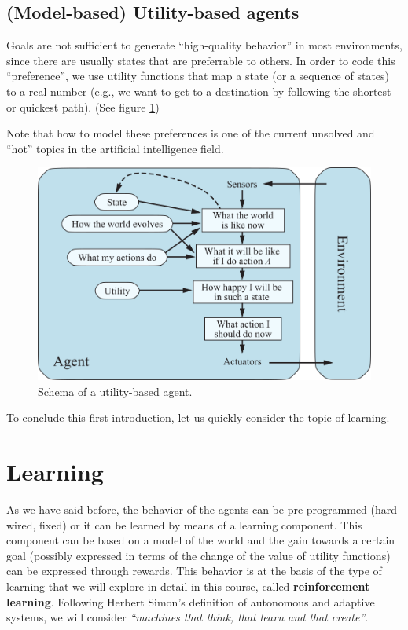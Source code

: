 \subsection{(Model-based) Utility-based agents}
Goals are not sufficient to generate “high-quality behavior” in most environments, since there are usually states that are preferrable to others. In order to code this “preference”, we use utility functions that map a state (or a sequence of states) to a real number (e.g., we want to get to a destination by following the shortest or quickest path). (See figure \ref{fig:ch1-utilitybasedagent})

Note that how to model these preferences is one of the current unsolved and “hot” topics in the artificial intelligence field.

\begin{figure}[hbtp]
    \centering
    \includegraphics{Images/Chapter 1/utility-based-agent.png}
    \caption{Schema of a utility-based agent.}
    \label{fig:ch1-utilitybasedagent}
\end{figure}

To conclude this first introduction, let us quickly consider the topic of learning.

\section{Learning}
As we have said before, the behavior of the agents can be pre-programmed (hard-wired, fixed) or it can be learned by means of a learning component. This component can be based on a model of the world and the gain towards a certain goal (possibly expressed in terms of the change of the value of utility functions) can be expressed through rewards. This behavior is at the basis of the type of learning that we will explore in detail in this course, called \textbf{reinforcement learning}. Following Herbert Simon’s definition of autonomous and adaptive systems, we will consider \textit{``machines that think, that learn and that create''}.